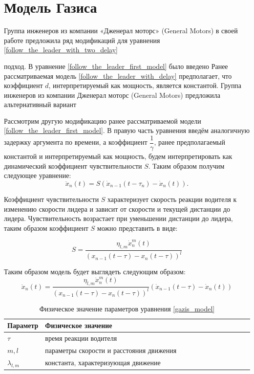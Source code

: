 \documentclass[12pt, a4paper]{extarticle}
\numberwithin{equation}{section}
\begin{document}
\section{Модель Газиса}

Группа инженеров из компании «Дженерал моторс» (General Motors) в своей работе \cite{GazisModel} предложила ряд модификаций для уравнения  \eqref{follow_the_leader_with_two_delay}

подход. В уравнение \eqref{follow_the_leader_first_model} было введено 
Ранее рассматриваемая модель  \eqref{follow_the_leader_with_delay} предполагает, что коэффициент $d$, интерпретируемый как мощность, является константой. Группа инженеров из компании Дженерал моторс (General Motors) предложила альтернативный вариант 

Рассмотрим другую модификацию ранее рассматриваемой модели \eqref{follow_the_leader_first_model}. В правую часть уравнения введём аналогичную задержку аргумента по времени, а коэффициент $\dfrac{1}{\gamma}$, ранее предполагаемый константой и интерпретируемый как мощность, будем интерпретировать как динамический коэффициент чувствительности $S$. Таким образом получим следующее уравнение: 
\begin{equation} \label{gazis_model}
\ddot{x}_n(t) = S (\dot{x}_{n-1}(t-\tau_{n}) - \dot{x}_{n}(t)).
\end{equation}

Коэффициент чувствительности $S$ характеризует скорость реакции водителя к изменению скорости лидера и зависит от скорости и текущей дистанции до лидера. Чувствительность возрастает при уменьшении дистанции до лидера, таким образом коэффициент $S$ можно представить в виде:

\begin{equation*}
S = \dfrac{\eta_{l,m}\dot{x}_n^m(t)}{(x_{n-1}(t-\tau)-x_n(t-\tau))^l}
\end{equation*}

Таким образом модель будет выглядеть следующим образом:
\begin{equation} \label{full_gazis_model}
\ddot{x}_n(t) = \dfrac{\eta_{l,m}\dot{x}_n^m(t)}{(x_{n-1}(t-\tau)-x_n(t-\tau))^l}(\dot{x}_{n-1}(t-\tau)-\dot{x}_{n}(t))
\end{equation} 
 

\begin{table}[h!]
	\caption{Физическое значение параметров уравнения \eqref{gazis_model}}
	\label{gazis_parameters}
	\begin{center}
		\begin{tabularx}{\textwidth}{p{0.15\linewidth}p{0.85\linewidth}}			
			\hline
			\rule{0cm}{0,5cm}
			Параметр &  Физическое значение \\ 
			[3pt]\hline
			$\tau$ & время реакции водителя \\
			$m, l$ & параметры скорости и расстояния движения \\
			$\lambda_{l,m} $ & константа, характеризующая движение  \\ 
			\hline
		\end{tabularx}
	\end{center}
\end{table} 
\end{document}
